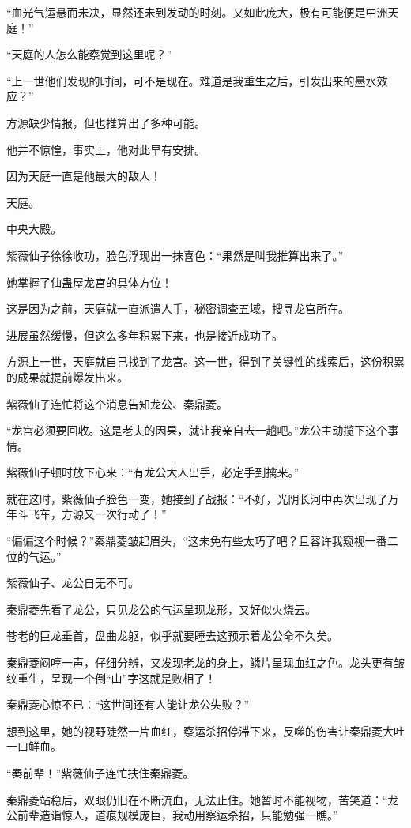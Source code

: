 \begin{this_body}
“血光气运悬而未决，显然还未到发动的时刻。又如此庞大，极有可能便是中洲天庭！”

“天庭的人怎么能察觉到这里呢？”

“上一世他们发现的时间，可不是现在。难道是我重生之后，引发出来的墨水效应？”

方源缺少情报，但也推算出了多种可能。

他并不惊惶，事实上，他对此早有安排。

因为天庭一直是他最大的敌人！

天庭。

中央大殿。

紫薇仙子徐徐收功，脸色浮现出一抹喜色：“果然是叫我推算出来了。”

她掌握了仙蛊屋龙宫的具体方位！

这是因为之前，天庭就一直派遣人手，秘密调查五域，搜寻龙宫所在。

进展虽然缓慢，但这么多年积累下来，也是接近成功了。

方源上一世，天庭就自己找到了龙宫。这一世，得到了关键性的线索后，这份积累的成果就提前爆发出来。

紫薇仙子连忙将这个消息告知龙公、秦鼎菱。

“龙宫必须要回收。这是老夫的因果，就让我亲自去一趟吧。”龙公主动揽下这个事情。

紫薇仙子顿时放下心来：“有龙公大人出手，必定手到擒来。”

就在这时，紫薇仙子脸色一变，她接到了战报：“不好，光阴长河中再次出现了万年斗飞车，方源又一次行动了！”

“偏偏这个时候？”秦鼎菱皱起眉头，“这未免有些太巧了吧？且容许我窥视一番二位的气运。”

紫薇仙子、龙公自无不可。

秦鼎菱先看了龙公，只见龙公的气运呈现龙形，又好似火烧云。

苍老的巨龙垂首，盘曲龙躯，似乎就要睡去这预示着龙公命不久矣。

秦鼎菱闷哼一声，仔细分辨，又发现老龙的身上，鳞片呈现血红之色。龙头更有皱纹重生，呈现一个倒“山”字这就是败相了！

秦鼎菱心惊不已：“这世间还有人能让龙公失败？”

想到这里，她的视野陡然一片血红，察运杀招停滞下来，反噬的伤害让秦鼎菱大吐一口鲜血。

“秦前辈！”紫薇仙子连忙扶住秦鼎菱。

秦鼎菱站稳后，双眼仍旧在不断流血，无法止住。她暂时不能视物，苦笑道：“龙公前辈造诣惊人，道痕规模庞巨，我动用察运杀招，只能勉强一瞧。”


\end{this_body}
